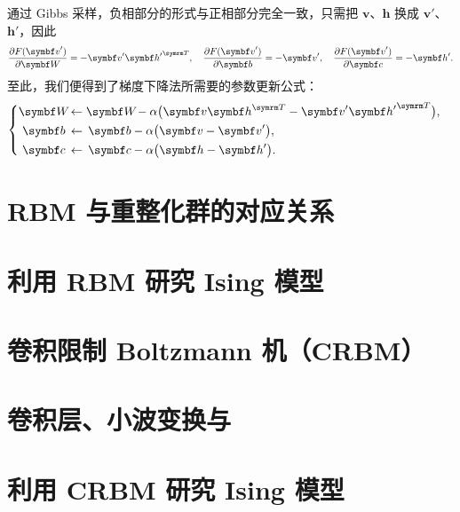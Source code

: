 通过 Gibbs 采样，负相部分的形式与正相部分完全一致，只需把 $\bm{v}$、$\bm{h}$ 换成 $\bm{v}'$、
$\bm{h}'$，因此
\begin{equation}
  \pdv{F(\bm{v}')}{\bm{W}} = - \bm{v}' {\bm{h}'}^\trans \qc
  \pdv{F(\bm{v}')}{\bm{b}} = - \bm{v}' \qc
  \pdv{F(\bm{v}')}{\bm{c}} = - \bm{h}'.
\end{equation}
至此，我们便得到了梯度下降法所需要的参数更新公式：
\begin{equation}
  \left\{
  \begin{aligned}
    \bm{W} \! &\gets \bm{W} \! - \alpha \qty\big(\bm{v} \bm{h}^\trans
                                                 - \bm{v}' {\bm{h}'}^\trans) \qc \\
    \bm{b} \, &\gets \, \bm{b} - \alpha \qty\big(\bm{v} - \bm{v}') \qc \\
    \bm{c} \, &\gets \, \bm{c} - \alpha \qty\big(\bm{h} - \bm{h}').
  \end{aligned}
  \right.
\end{equation}

\section{RBM 与重整化群的对应关系}

\section{利用 RBM 研究 Ising 模型}
\section{卷积限制 Boltzmann 机（CRBM）}
\section{卷积层、小波变换与 \AdSCFT{}}
\section{利用 CRBM 研究 Ising 模型}
